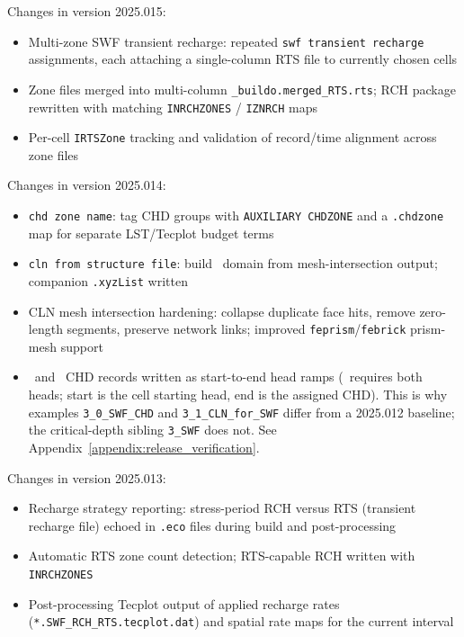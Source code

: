 \label{changes:2025.015}
Changes in version 2025.015:
\begin{itemize}
\item Multi-zone SWF transient recharge: repeated \texttt{swf transient recharge} assignments, each attaching a single-column RTS file to currently chosen cells
\item Zone files merged into multi-column \texttt{\_buildo.merged\_RTS.rts}; RCH package rewritten with matching \texttt{INRCHZONES} / \texttt{IZNRCH} maps
\item Per-cell \texttt{IRTSZone} tracking and validation of record/time alignment across zone files
\end{itemize}

\label{changes:2025.014}
Changes in version 2025.014:
\begin{itemize}
\item \texttt{chd zone name}: tag CHD groups with \texttt{AUXILIARY CHDZONE} and a \texttt{.chdzone} map for separate LST/Tecplot budget terms
\item \texttt{cln from structure file}: build \cln\ domain from mesh-intersection output; companion \texttt{.xyzList} written
\item CLN mesh intersection hardening: collapse duplicate face hits, remove zero-length segments, preserve network links; improved \texttt{feprism}/\texttt{febrick} prism-mesh support
\item \cln\ and \swf\ CHD records written as start-to-end head ramps (\mfus\ requires both heads; start is the cell starting head, end is the assigned CHD). This is why examples \texttt{3\_0\_SWF\_CHD} and \texttt{3\_1\_CLN\_for\_SWF} differ from a 2025.012 baseline; the critical-depth sibling \texttt{3\_SWF} does not. See Appendix~\ref{appendix:release_verification}.
\end{itemize}

\label{changes:2025.013}
Changes in version 2025.013:
\begin{itemize}
\item Recharge strategy reporting: stress-period \textsf{RCH} versus \textsf{RTS} (transient recharge file) echoed in \texttt{.eco} files during build and post-processing
\item Automatic RTS zone count detection; RTS-capable RCH written with \texttt{INRCHZONES}
\item Post-processing Tecplot output of applied recharge rates (\texttt{*.SWF\_RCH\_RTS.tecplot.dat}) and spatial rate maps for the current interval
\end{itemize}

